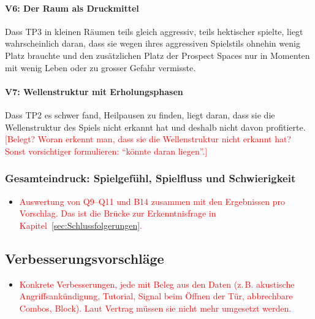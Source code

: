\documentclass[../Main.tex]{subfiles}
\begin{document}
\paragraph{V6: Der Raum als Druckmittel}
Dass TP3 in kleinen Räumen teils gleich aggressiv, teils hektischer spielte, liegt wahrscheinlich daran, dass sie wegen ihres aggressiven Spielstils ohnehin wenig Platz brauchte und den zusätzlichen Platz der Prospect Spaces nur in Momenten mit wenig Leben oder zu grosser Gefahr vermisste.

\paragraph{V7: Wellenstruktur mit Erholungsphasen}
Dass TP2 es schwer fand, Heilpausen zu finden, liegt daran, dass sie die Wellenstruktur des Spiels nicht erkannt hat und deshalb nicht davon profitierte. \textcolor{red}{[Belegt? Woran erkennt man, dass sie die Wellenstruktur nicht erkannt hat? Sonst vorsichtiger formulieren: \enquote{könnte daran liegen}.]}

\subsubsection{Gesamteindruck: Spielgefühl, Spielfluss und Schwierigkeit} \label{sec:Gesamteindruck}

\begin{itemize}[leftmargin=1.5cm]
    \item \textcolor{red}{Auswertung von Q9--Q11 und B14 zusammen mit den Ergebnissen pro Vorschlag. Das ist die Brücke zur Erkenntnisfrage in Kapitel~\ref{sec:Schlussfolgerungen}.}
\end{itemize}

\subsection{Verbesserungsvorschläge} \label{sec:Verbesserungen}

\begin{itemize}[leftmargin=1.5cm]
    \item \textcolor{red}{Konkrete Verbesserungen, jede mit Beleg aus den Daten (z.\,B. akustische Angriffsankündigung, Tutorial, Signal beim Öffnen der Tür, abbrechbare Combos, Block). Laut Vertrag müssen sie nicht mehr umgesetzt werden.}
\end{itemize}
\end{document}
